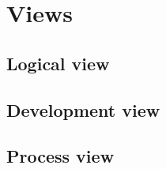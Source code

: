 \section{Views}

\subsection{Logical view}

\subsection{Development view}

\subsection{Process view}




